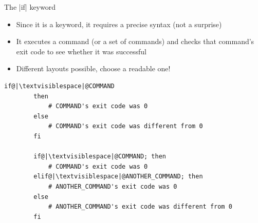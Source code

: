 \begin{frame}[fragile]{The \bash|if| keyword}
    \vspace{-1mm}
    \begin{itemize}
        \item Since it is a keyword, it requires a precise syntax (not a surprise)
        \item It executes a command (or a set of commands) and checks that command's exit code to see whether it was successful
        \item Different layouts possible, choose a readable one!
    \end{itemize}

    \begin{lstlisting}[style=MyBash, numbers=none]
        if@|\textvisiblespace|@COMMAND
        then
            # COMMAND's exit code was 0
        else
            # COMMAND's exit code was different from 0
        fi

        if@|\textvisiblespace|@COMMAND; then
            # COMMAND's exit code was 0
        elif@|\textvisiblespace|@ANOTHER_COMMAND; then
            # ANOTHER_COMMAND's exit code was 0
        else
            # ANOTHER_COMMAND's exit code was different from 0
        fi
    \end{lstlisting}
\end{frame}
